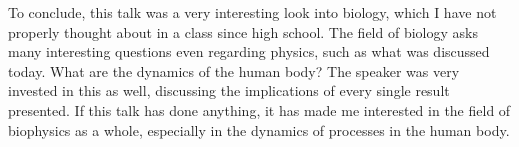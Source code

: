 \documentclass[12pt]{article}
\begin{document}
To conclude, this talk was a very interesting look into biology, which I have not properly thought about in a class since high school. The field of biology asks many interesting questions even regarding physics, such as what was discussed today. What are the dynamics of the human body? The speaker was very invested in this as well, discussing the implications of every single result presented. If this talk has done anything, it has made me interested in the field of biophysics as a whole, especially in the dynamics of processes in the human body.
\end{document}
